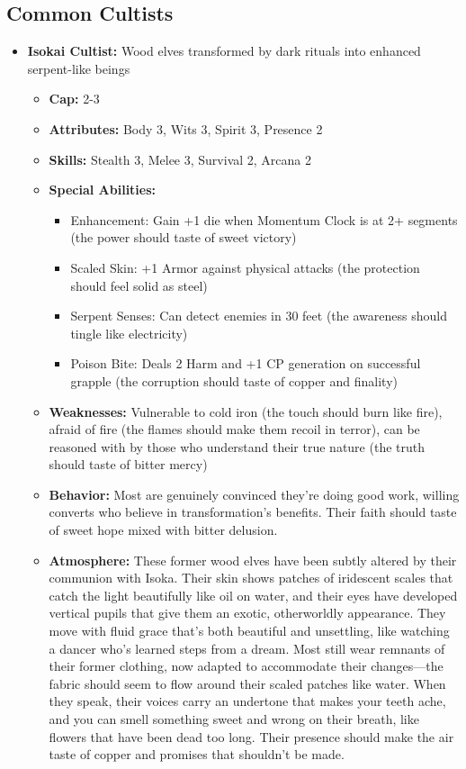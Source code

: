 \documentclass[11pt]{article}
\begin{document}
\subsection{Common Cultists}
\begin{itemize}
\item \textbf{Isokai Cultist:} Wood elves transformed by dark rituals into enhanced serpent-like beings
  \begin{itemize}
  \item \textbf{Cap:} 2-3
  \item \textbf{Attributes:} Body 3, Wits 3, Spirit 3, Presence 2
  \item \textbf{Skills:} Stealth 3, Melee 3, Survival 2, Arcana 2
  \item \textbf{Special Abilities:}
    \begin{itemize}
    \item Enhancement: Gain +1 die when Momentum Clock is at 2+ segments (the power should taste of sweet victory)
    \item Scaled Skin: +1 Armor against physical attacks (the protection should feel solid as steel)
    \item Serpent Senses: Can detect enemies in 30 feet (the awareness should tingle like electricity)
    \item Poison Bite: Deals 2 Harm and +1 CP generation on successful grapple (the corruption should taste of copper and finality)
    \end{itemize}
  \item \textbf{Weaknesses:} Vulnerable to cold iron (the touch should burn like fire), afraid of fire (the flames should make them recoil in terror), can be reasoned with by those who understand their true nature (the truth should taste of bitter mercy)
  \item \textbf{Behavior:} Most are genuinely convinced they're doing good work, willing converts who believe in transformation's benefits. Their faith should taste of sweet hope mixed with bitter delusion.
  \item \textbf{Atmosphere:} These former wood elves have been subtly altered by their communion with Isoka. Their skin shows patches of iridescent scales that catch the light beautifully like oil on water, and their eyes have developed vertical pupils that give them an exotic, otherworldly appearance. They move with fluid grace that's both beautiful and unsettling, like watching a dancer who's learned steps from a dream. Most still wear remnants of their former clothing, now adapted to accommodate their changes—the fabric should seem to flow around their scaled patches like water. When they speak, their voices carry an undertone that makes your teeth ache, and you can smell something sweet and wrong on their breath, like flowers that have been dead too long. Their presence should make the air taste of copper and promises that shouldn't be made.
  \end{itemize}


\end{itemize}
\end{document}
